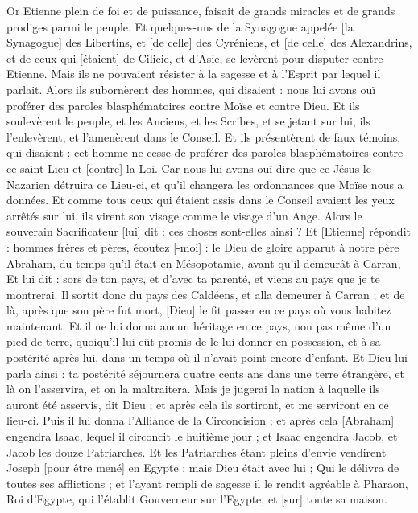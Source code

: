\begin{multicols}{2}
Or Etienne plein de foi et de puissance, faisait de grands miracles et de grands prodiges parmi le peuple.
Et quelques-uns de la Synagogue appelée [la Synagogue] des Libertins, et [de celle] des Cyréniens, et [de celle] des Alexandrins, et de ceux qui [étaient] de Cilicie, et d'Asie, se levèrent pour disputer contre Etienne.
Mais ils ne pouvaient résister à la sagesse et à l'Esprit par lequel il parlait.
Alors ils subornèrent des hommes, qui disaient : nous lui avons ouï proférer des paroles blasphématoires contre Moïse et contre Dieu.
Et ils soulevèrent le peuple, et les Anciens, et les Scribes, et se jetant sur lui, ils l'enlevèrent, et l'amenèrent dans le Conseil.
Et ils présentèrent de faux témoins, qui disaient : cet homme ne cesse de proférer des paroles blasphématoires contre ce saint Lieu et [contre] la Loi.
Car nous lui avons ouï dire que ce Jésus le Nazarien détruira ce Lieu-ci, et qu'il changera les ordonnances que Moïse nous a données.
Et comme tous ceux qui étaient assis dans le Conseil avaient les yeux arrêtés sur lui, ils virent son visage comme le visage d'un Ange.
\VerseOne{}Alors le souverain Sacrificateur [lui] dit : ces choses sont-elles ainsi ?
Et [Etienne] répondit : hommes frères et pères, écoutez [-moi] : le Dieu de gloire apparut à notre père Abraham, du temps qu'il était en Mésopotamie, avant qu'il demeurât à Carran,
Et lui dit : sors de ton pays, et d'avec ta parenté, et viens au pays que je te montrerai.
Il sortit donc du pays des Caldéens, et alla demeurer à Carran ; et de là, après que son père fut mort, [Dieu] le fit passer en ce pays où vous habitez maintenant.
Et il ne lui donna aucun héritage en ce pays, non pas même d'un pied de terre, quoiqu'il lui eût promis de le lui donner en possession, et à sa postérité après lui, dans un temps où il n'avait point encore d'enfant.
Et Dieu lui parla ainsi : ta postérité séjournera quatre cents ans dans une terre étrangère, et là on l'asservira, et on la maltraitera.
Mais je jugerai la nation à laquelle ils auront été asservis, dit Dieu ; et après cela ils sortiront, et me serviront en ce lieu-ci.
Puis il lui donna l'Alliance de la Circoncision ; et après cela [Abraham] engendra Isaac, lequel il circoncit le huitième jour ; et Isaac engendra Jacob, et Jacob les douze Patriarches.
Et les Patriarches étant pleins d'envie vendirent Joseph [pour être mené] en Egypte ; mais Dieu était avec lui ;
Qui le délivra de toutes ses afflictions ; et l'ayant rempli de sagesse il le rendit agréable à Pharaon, Roi d'Egypte, qui l'établit Gouverneur sur l'Egypte, et [sur] toute sa maison.

\end{multicols}
